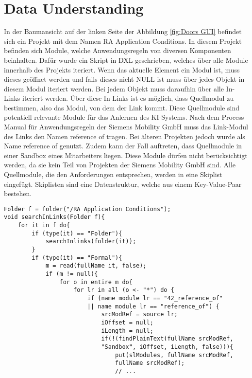 \section{Data Understanding}
\label{chap:DataUnderstanding}

In der Baumansicht auf der linken Seite der Abbildung \ref*{fig:Doors GUI} befindet sich ein Projekt mit dem Namen \glqq RA Application Conditions\grqq{}. In diesem Projekt befinden sich Module, welche
Anwendungsregeln von diversen Komponenten beinhalten. Dafür wurde ein Skript in \acs{DXL} geschrieben, welches über alle Module innerhalb des Projekts iteriert. Wenn das aktuelle Element ein Modul ist,
muss dieses geöffnet werden und falls dieses nicht NULL ist muss über jedes Objekt in diesem Modul iteriert werden. Bei jedem Objekt muss daraufhin über alle In-Links iteriert werden. Über diese 
In-Links ist es möglich, dass Quellmodul zu bestimmen, also das Modul, von dem der Link kommt. Diese Quellmodule sind potentiell relevante Module für das Anlernen des KI-Systems. Nach dem Process Manual für
Anwendungsregeln der Siemens Mobility GmbH \cite[S.32]{q2} muss das Link-Modul des Links den Namen  reference of\grqq{} tragen. Bei älteren Projekten jedoch wurde als Name 
\glqq reference of\grqq{} genutzt. Zudem kann der Fall auftreten, dass Quellmodule in einer Sandbox eines Mitarbeiters liegen. Diese Module dürfen nicht berücksichtigt werden, da sie kein Teil
von Projekten der Siemens Mobility GmbH sind. Alle Quellmodule, die den Anforderungen entsprechen, werden in eine Skiplist eingefügt. Skiplisten sind eine Datenstruktur, welche aus einem 
Key-Value-Paar bestehen. 

\begin{lstlisting}[caption={Iterieren über alle Module von RA Application Conditions},captionpos=b, label = lst:searchInLinks]
Folder f = folder("/RA Application Conditions");
void searchInLinks(Folder f){
    for it in f do{
        if (type(it) == "Folder"){
            searchInlinks(folder(it));
        }
        if (type(it) == "Formal"){
            m = read(fullName it, false);
            if (m != null){
                for o in entire m do{
                    for lr in all (o <- "*") do {
                        if (name module lr == "42_reference_of" 
                        || name module lr == "reference_of") {
                            srcModRef = source lr;
                            iOffset = null;
                            iLength = null;
                            if(!(findPlainText(fullName srcModRef, 
                            "Sandbox", iOffset, iLength, false))){
                                put(slModules, fullName srcModRef, 
                                fullName srcModRef);
                                // ...
\end{lstlisting}

